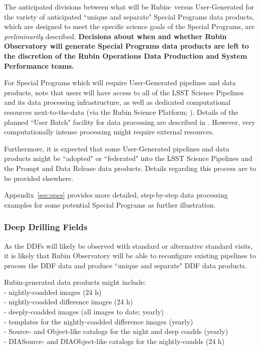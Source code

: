 \documentclass[DM,lsstdoc,toc]{lsstdoc}
\begin{document}
The anticipated divisions between what will be Rubin- versus User-Generated for the variety of anticipated ``unique and separate" Special Programs data products, which are designed to meet the specific science goals of the Special Programs, are {\it preliminarily} described.
{\bf Decisions about when and whether Rubin Observatory will generate Special Programs data products are left to the discretion of the Rubin Operations Data Production and System Performance teams.}

For Special Programs which will require User-Generated pipelines and data products, note that users will have access to all of the LSST Science Pipelines and its data processing infrastructure, as well as dedicated computational resources next-to-the-data (via the Rubin Science Platform; ).
Details of the planned ``User Batch" facility for data processing are described in .
However, very computationally intense processing might require external resources. 

Furthermore, it is expected that some User-Generated pipelines and data products might be ``adopted" or ``federated" into the LSST Science Pipelines and the Prompt and Data Release data products. 
Details regarding this process are to be provided elsewhere.

Appendix~\ref{sec:spcs} provides more detailed, step-by-step data processing examples for some potential Special Programs as further illustration. 

\subsubsection{Deep Drilling Fields}

As the DDFs will likely be observed with standard or alternative standard visits, it is likely that Rubin Observatory will be able to reconfigure existing pipelines to process the DDF data and produce ``unique and separate" DDF data products.

Rubin-generated data products might include:\\
 - nightly-coadded images (24 h)\\
 - nightly-coadded difference images (24 h)\\
 - deeply-coadded images (all images to date; yearly)\\
 - templates for the nightly-coadded difference images (yearly)\\
 - Source- and Object-like catalogs for the night and deep coadds (yearly)\\
 - DIASource- and DIAObject-like catalogs for the nightly-coadds (24 h)\\
\end{document}
